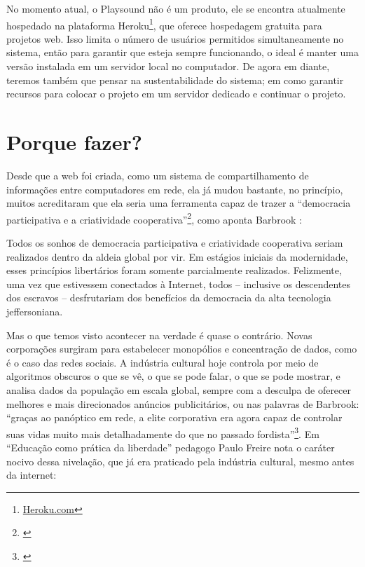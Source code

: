 No momento atual, o Playsound não é um produto, ele se encontra atualmente hospedado na plataforma Heroku\footnote{\url{Heroku.com}}, que oferece hospedagem gratuita para projetos web. Isso limita o número de usuários permitidos simultaneamente no sistema, então para garantir que esteja sempre funcionando, o ideal é manter uma versão instalada em um servidor local no computador. De agora em diante, teremos também que pensar na sustentabilidade do sistema; em como garantir recursos para colocar o projeto em um servidor dedicado e continuar o projeto.  











\section{Porque fazer?}

Desde que a web foi criada, como um sistema de compartilhamento de informações entre computadores em rede, ela já mudou bastante, no princípio, muitos acreditaram que ela seria uma ferramenta capaz de trazer a ``democracia participativa e a criatividade cooperativa''\footnote{\cite[p. 360]{Barbrook2009}}, como aponta Barbrook \citeyear{Barbrook2009}:

\begin{citacao}
Todos os sonhos de democracia participativa e criatividade cooperativa seriam realizados dentro da aldeia global por vir. Em estágios iniciais da modernidade, esses princípios libertários foram somente parcialmente realizados. Felizmente, uma vez que estivessem conectados à Internet, todos – inclusive os descendentes dos escravos – desfrutariam dos benefícios da democracia da alta tecnologia jeffersoniana.\cite[p. 365]{Barbrook2009}
\end{citacao}

Mas o que temos visto acontecer na verdade é quase o contrário. Novas corporações surgiram para estabelecer monopólios e concentração de dados, como é o caso das redes sociais. A indústria cultural hoje controla por meio de algoritmos obscuros o que se vê, o que se pode falar, o que se pode mostrar, e analisa dados da população em escala global, sempre com a desculpa de oferecer melhores e mais direcionados anúncios publicitários, ou nas palavras de Barbrook: ``graças ao panóptico em rede, a elite corporativa era agora capaz de controlar suas vidas muito mais detalhadamente do que no passado fordista''\footnote{\cite[p.  345]{Barbrook2009}}. Em ``Educação como prática da liberdade'' pedagogo Paulo Freire nota o caráter nocivo dessa nivelação, que já era praticado pela indústria cultural, mesmo antes da internet:


